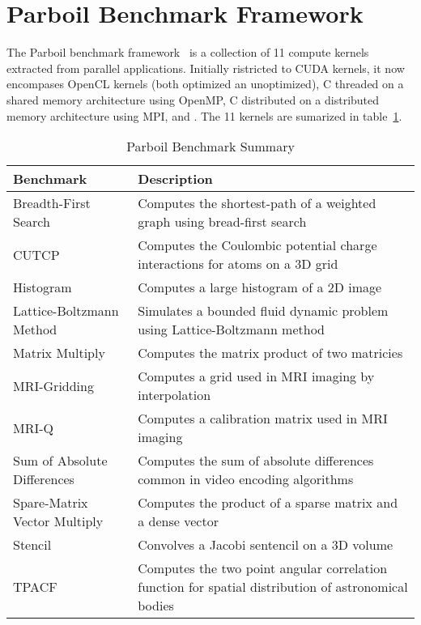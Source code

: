 
\section{Parboil Benchmark Framework}

The Parboil benchmark framework~\cite{Parboil} is a collection
  of 11 compute kernels extracted from parallel applications.
Initially ristricted to CUDA kernels, it now encompases  
  OpenCL kernels (both optimized an unoptimized), 
  C threaded on a shared memory architecture using OpenMP,
  C distributed on a distributed memory architecture using MPI,
  and .
The 11 kernels are sumarized in table~\ref{table:parboil}.

\begin{table}[h]\footnotesize
\centering
\begin{tabular}{ | l | p{4cm} |}
    \hline 
    Benchmark & Description \\ \hline
    Breadth-First Search & Computes the shortest-path of a weighted graph using bread-first search \\
    CUTCP & Computes the Coulombic potential charge interactions for atoms on a 3D grid \\
    Histogram & Computes a large histogram of a 2D image \\
    Lattice-Boltzmann Method & Simulates a bounded fluid dynamic problem using Lattice-Boltzmann method \\
    Matrix Multiply & Computes the matrix product of two matricies \\
    MRI-Gridding & Computes a grid used in MRI imaging by interpolation \\
    MRI-Q & Computes a calibration matrix used in MRI imaging \\
    Sum of Absolute Differences & Computes the sum of absolute differences common in video encoding algorithms \\
    Spare-Matrix Vector Multiply & Computes the product of a sparse matrix and a dense vector \\
    Stencil & Convolves a Jacobi sentencil on a 3D volume \\
    TPACF & Computes the two point angular correlation function for spatial distribution of astronomical bodies \\   
    \hline
\end{tabular}
\caption{Parboil Benchmark Summary}
\label{table:parboil}
\end{table}
